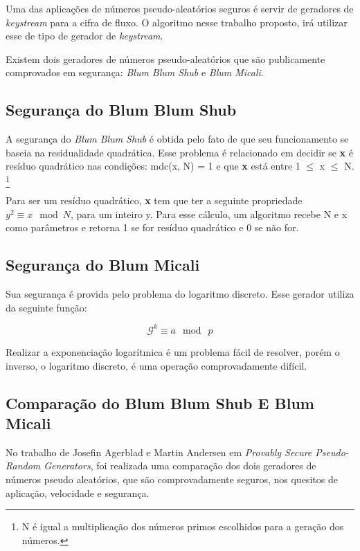 Uma das aplicações de números pseudo-aleatórios seguros é servir de geradores de \textit{keystream} para a cifra de fluxo. O algoritmo nesse trabalho proposto, irá utilizar esse de tipo de gerador de \textit{keystream}.

Existem dois geradores de números pseudo-aleatórios que são publicamente comprovados em segurança: \textit{Blum Blum Shub} e \textit{Blum Micali}.

\subsection{Segurança do Blum Blum Shub}

A segurança do \textit{Blum Blum Shub} é obtida pelo fato de que seu funcionamento se baseia na residualidade quadrática. Esse problema é relacionado em decidir se \textbf{x} é resíduo quadrático nas condições: mdc(x, N) = 1 e que \textbf{x} está entre 1 $\le$  x $\le$ N. \footnote{N é igual a multiplicação dos números primos escolhidos para a geração dos números.}

Para ser um resíduo quadrático, \textbf{x} tem que ter a seguinte propriedade $y ^ 2 \equiv x \: \bmod N$, para um inteiro y. Para esse cálculo, um algoritmo recebe N e x como parâmetros e retorna 1 se for resíduo quadrático e 0 se não for.~\cite{josefin-martin}

\subsection{Segurança do Blum Micali}

Sua segurança é provida pelo problema do logaritmo discreto. Esse gerador utiliza da seguinte função:

\begin{equation}
	\mathcal{G}^k \equiv a \: \bmod \: p 
\end{equation}

Realizar a exponenciação logarítmica é um problema fácil de resolver, porém o inverso, o logaritmo discreto, é uma operação comprovadamente difícil.

\subsection{Comparação do Blum Blum Shub E Blum Micali}

No trabalho de Josefin Agerblad e  Martin Andersen em \textit{Provably Secure Pseudo-Random Generators}, foi realizada uma comparação dos dois geradores de números pseudo aleatórios, que são comprovadamente seguros, nos quesitos de aplicação, velocidade e segurança.

